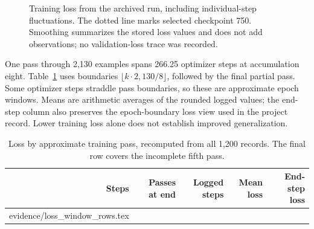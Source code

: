 \begin{figure}[htbp]
\centering
{}
\caption{Training loss from the archived run, including individual-step fluctuations. The dotted line marks selected checkpoint 750. Smoothing summarizes the stored loss values and does not add observations; no validation-loss trace was recorded.}
\label{fig:training-loss}
\end{figure}

One pass through 2,130 examples spans 266.25 optimizer steps at accumulation eight. Table~\ref{tab:epoch-loss} uses boundaries $\lfloor k\cdot2{,}130/8\rfloor$, followed by the final partial pass. Some optimizer steps straddle pass boundaries, so these are approximate epoch windows. Means are arithmetic averages of the rounded logged values; the end-step column also preserves the epoch-boundary loss view used in the project record. Lower training loss alone does not establish improved generalization.

\begin{table}[htbp]
\centering\small
\caption{Loss by approximate training pass, recomputed from all 1,200 records. The final row covers the incomplete fifth pass.}
\label{tab:epoch-loss}
\begin{tabular}{rrrrr}
\toprule
Steps & Passes at end & Logged steps & Mean loss & End-step loss \\
\midrule
{} evidence/loss_window_rows.tex
\bottomrule
\end{tabular}
\end{table}

